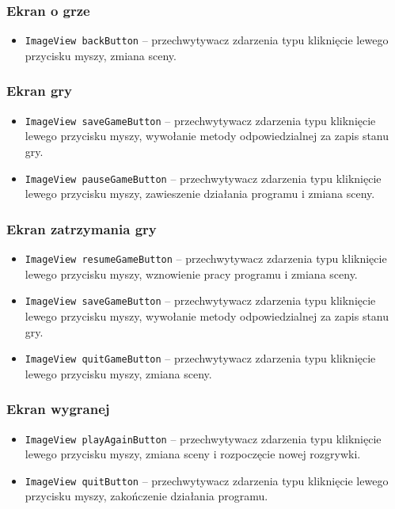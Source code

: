 \documentclass[a4paper]{article}
\newcommand{\prog}{\texttt}
\begin{document}
\subsubsection{Ekran o grze}
\begin{itemize}
    \item \prog{ImageView backButton} -- przechwytywacz zdarzenia typu kliknięcie lewego przycisku myszy, zmiana sceny.
\end{itemize}

\subsubsection{Ekran gry}
\begin{itemize}
    \item \prog{ImageView saveGameButton} -- przechwytywacz zdarzenia typu kliknięcie lewego przycisku myszy, wywołanie metody odpowiedzialnej za zapis stanu gry.
    \item \prog{ImageView pauseGameButton} -- przechwytywacz zdarzenia typu kliknięcie lewego przycisku myszy, zawieszenie działania programu i zmiana sceny.
\end{itemize}

\subsubsection{Ekran zatrzymania gry}
\begin{itemize}
    \item \prog{ImageView resumeGameButton} -- przechwytywacz zdarzenia typu kliknięcie lewego przycisku myszy, wznowienie pracy programu i zmiana sceny.
    \item \prog{ImageView saveGameButton} -- przechwytywacz zdarzenia typu kliknięcie lewego przycisku myszy, wywołanie metody odpowiedzialnej za zapis stanu gry.
    \item \prog{ImageView quitGameButton} -- przechwytywacz zdarzenia typu kliknięcie lewego przycisku myszy, zmiana sceny.
\end{itemize}

\subsubsection{Ekran wygranej}
\begin{itemize}
    \item \prog{ImageView playAgainButton} -- przechwytywacz zdarzenia typu kliknięcie lewego przycisku myszy, zmiana sceny i rozpoczęcie nowej rozgrywki.
    \item \prog{ImageView quitButton} -- przechwytywacz zdarzenia typu kliknięcie lewego przycisku myszy, zakończenie działania programu.
\end{itemize}
\end{document}
